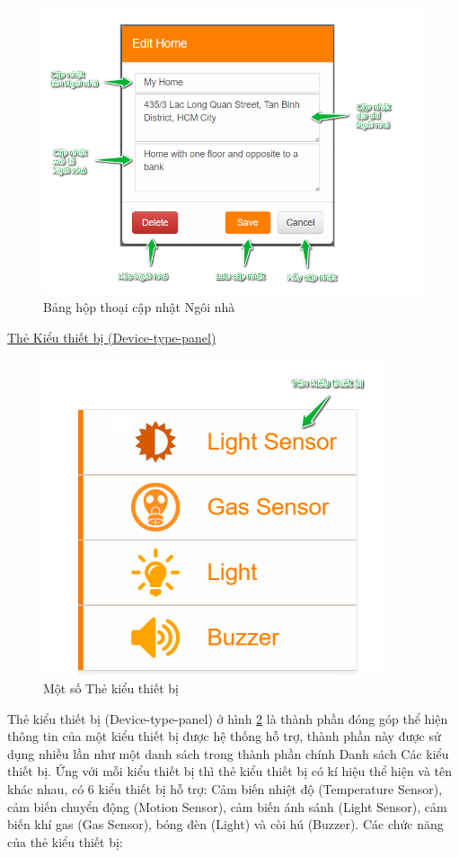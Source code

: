 \documentclass[12pt,a4paper,oneside]{extbook}
\begin{document}
\begin{figure}[h!]
  \centering
     \includegraphics[width=12cm]{6-EditHome}
  \caption{Bảng hộp thoại cập nhật Ngôi nhà}\label{fig:6-EditHome}
\end{figure}

\noindent
\underline{Thẻ Kiểu thiết bị (Device-type-panel)}

\begin{figure}[h]
  \centering
     \includegraphics[width=10cm]{6-device-type-panels}
  \caption{Một số Thẻ kiểu thiết bị}\label{fig:6-device-type-panels}
\end{figure}

\noindent
Thẻ kiểu thiết bị (Device-type-panel) ở hình \ref{fig:6-device-type-panels} là thành phần đóng góp thể hiện thông tin của một kiểu thiết bị được hệ thống hỗ trợ, thành phần này được sử dụng nhiều lần như một danh sách trong thành phần chính Danh sách Các kiểu thiết bị. Ứng với mỗi kiểu thiết bị thì thẻ kiểu thiết bị có kí hiệu thể hiện và tên khác nhau, có 6 kiểu thiết bị hỗ trợ: Cảm biến nhiệt độ (Temperature Sensor), cảm biến chuyển động (Motion Sensor), cảm biến ánh sánh (Light Sensor), cảm biến khí gas (Gas Sensor), bóng đèn (Light) và còi hú (Buzzer). Các chức năng của thẻ kiểu thiết bị:
\end{document}
